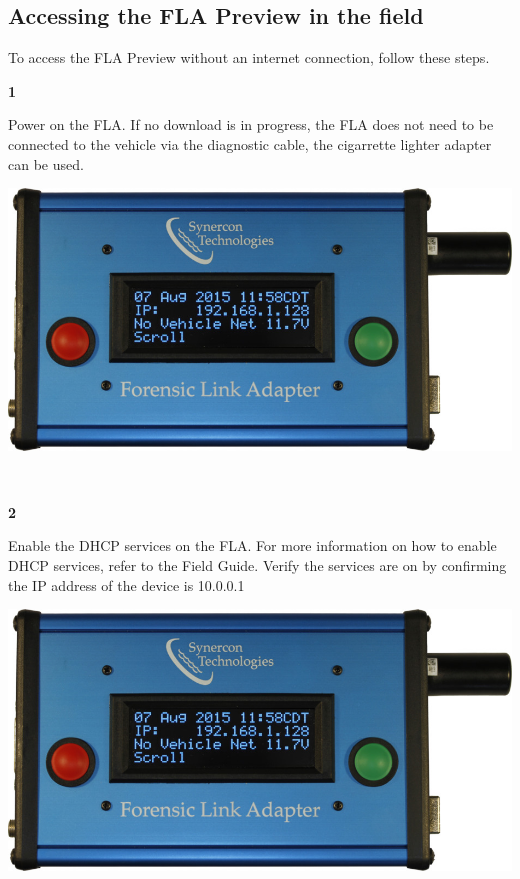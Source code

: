\documentclass[11pt]{article}
\begin{document}
\subsection{Accessing the FLA Preview in the field}
To access the FLA Preview without an internet connection, follow these steps.\\[\baselineskip]
\noindent\begin{minipage}{0.3\textwidth}%
\begin{center}
\textbf{1}\\[\baselineskip]
\end{center}
Power on the FLA. If no download is in progress, the FLA does not need to be connected to the vehicle via the diagnostic cable, the cigarrette lighter adapter can be used.
\end{minipage}%
\hfill%
\begin{minipage}{0.6\textwidth}
\includegraphics[width=\linewidth]{../../media/fla_screens/ethernet_and_others/main/title_no_net}
\end{minipage}\\[\baselineskip]
\noindent\begin{minipage}{0.3\textwidth}%
\begin{center}
\textbf{2}\\[\baselineskip]
\end{center}
Enable the DHCP services on the FLA. For more information on how to enable DHCP services, refer to the Field Guide. Verify the services are on by confirming the IP address of the device is 10.0.0.1
\end{minipage}%
\hfill%
\begin{minipage}{0.6\textwidth}
\includegraphics[width=\linewidth]{../../media/fla_screens/ethernet_and_others/main/title_no_net}
\end{minipage}\\[\baselineskip]
\end{document}
